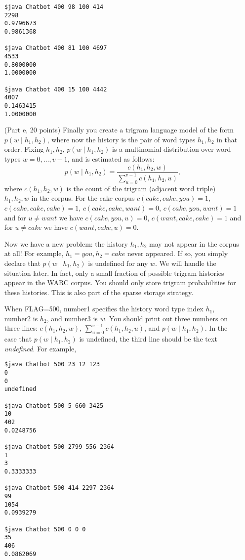\documentclass{article}
\begin{document}
\begin{itemize}
\begin{verbatim}
$java Chatbot 400 98 100 414
2298
0.9796673
0.9861368

$java Chatbot 400 81 100 4697
4533
0.8000000
1.0000000

$java Chatbot 400 15 100 4442
4007
0.1463415
1.0000000

\end{verbatim}


\item[(Part e, 20 points)]
Finally you create a trigram language model
of the form $p(w \mid h_1, h_2)$, where now the history is the pair of word types $h_1, h_2$ in that order.
Fixing $h_1, h_2$, $p(w \mid h_1, h_2)$ is a multinomial distribution over word types $w=0, \ldots, v-1$, and is estimated as follows:
$$p(w \mid h_1, h_2) = \frac{c(h_1, h_2,w)}{\sum_{u=0}^{v-1} c(h_1, h_2,u)},$$
where $c(h_1,h_2,w)$ is the count of the trigram (adjacent word triple) $h_1,h_2,w$ in the corpus.
For the cake corpus 
$c(cake, cake, you)=1$,
$c(cake, cake, cake)=1$,
$c(cake, cake, want)=0$,
$c(cake, you, want)=1$ and for $u \neq want$ we have $c(cake, you, u)=0$,
$c(want, cake, cake)=1$ and for $u \neq cake$ we have $c(want, cake, u)=0$.

Now we have a new problem: the history $h_1, h_2$ may not appear in the corpus at all!  For example, $h_1=you, h_2=cake$ never appeared.
If so, you simply declare that $p(w \mid h_1, h_2)$ is undefined for any $w$.
We will handle the situation later.
In fact, only a small fraction of possible trigram histories appear in the WARC corpus.
You should only store trigram probabilities for these histories.
This is also part of the sparse storage strategy.

When FLAG=500, number1 specifies the history word type index $h_1$, number2 is $h_2$, and number3 is $w$.  You should print out three numbers on three lines: $c(h_1, h_2,w)$, $\sum_{u=0}^{v-1} c(h_1, h_2,u)$, and $p(w \mid h_1, h_2)$.
In the case that $p(w \mid h_1, h_2)$ is undefined, the third line should be the text \emph{undefined}.
For example,
\begin{verbatim}
$java Chatbot 500 23 12 123
0
0
undefined

$java Chatbot 500 5 660 3425
10
402
0.0248756

$java Chatbot 500 2799 556 2364
1
3
0.3333333

$java Chatbot 500 414 2297 2364
99
1054
0.0939279

$java Chatbot 500 0 0 0
35
406
0.0862069
\end{verbatim}


\end{itemize}
\end{document}
